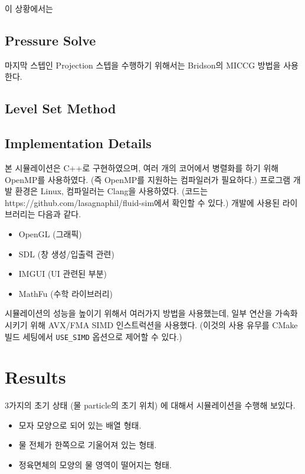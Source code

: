\documentclass[12pt, A4]{article}
\begin{document}
이 상황에서는 

\subsection{Pressure Solve}

마지막 스텝인 Projection 스텝을 수행하기 위해서는 Bridson의 MICCG 방법을 사용한다. \cite[79]{fluid-sim-cg}

\subsection{Level Set Method}


\subsection{Implementation Details}

본 시뮬레이션은 C++로 구현하였으며, 여러 개의 코어에서 병렬화를 하기 위해 OpenMP를 사용하였다. (즉 OpenMP를 지원하는 컴파일러가 필요하다.) 프로그램 개발 환경은 Linux, 컴파일러는 Clang을 사용하였다. (코드는 https://github.com/lasagnaphil/fluid-sim에서 확인할 수 있다.) 개발에 사용된 라이브러리는 다음과 같다.

\begin{itemize}
  \item OpenGL (그래픽)
  \item SDL (창 생성/입출력 관련)
  \item IMGUI (UI 관련된 부분)
  \item MathFu (수학 라이브러리)
\end{itemize}

시뮬레이션의 성능을 높이기 위해서 여러가지 방법을 사용했는데, 일부 연산을 가속화시키기 위해 AVX/FMA SIMD 인스트럭션을 사용했다. (이것의 사용 유무를 CMake 빌드 세팅에서 \texttt{USE\_SIMD} 옵션으로 제어할 수 있다.)

\section{Results}

3가지의 초기 상태 (물 particle의 초기 위치) 에 대해서 시뮬레이션을 수행해 보있다.

\begin{itemize}
  \item 모자 모양으로 되어 있는 배열 형태.
  \item 물 전체가 한쪽으로 기울어져 있는 형태.
  \item 정육면체의 모양의 물 영역이 떨어지는 형태.
\end{itemize}
\end{document}
